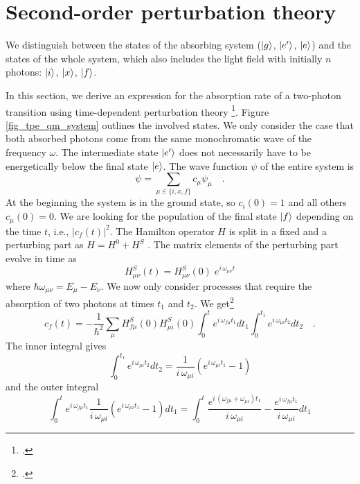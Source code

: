\section{Second-order perturbation theory}

\begin{marginfigure}

\caption{
We distinguish between the states of the absorbing system
($\ket{g}$, $\ket{e'}$, $\ket{e}$) and the states of the whole system, which
also includes the light field with initially $n$ photons: $\ket{i}$, $\ket{x}$, $\ket{f}$. }
\label{fig_tpe_qm_system}
\end{marginfigure}

In this section, we derive an expression for
the absorption rate of a two-photon transition using 
time-dependent perturbation theory
\footcite{Haken_wolf_II,mystre_quantum_optics}.
Figure \ref{fig_tpe_qm_system} outlines the involved
states. We only  consider the case
that both absorbed photons come from the same monochromatic
wave of the frequency $\omega$. The intermediate state 
$\ket{e'}$
does not necessarily have to be energetically below the final state $\ket{e}$.
The wave function $\psi$ of the entire system is
\begin{equation}
\psi = \sum_{\mu \in \{i, x, f\}} c_{\mu} \psi_{\mu} \quad.
\end{equation}
At the beginning the system is in the ground state, so $c_i(0)
= 1$ and all others $c_{\mu}(0) = 0$. We are looking for the population
of the final state $\ket{f}$ depending on the time $t$, i.e.,
$|c_f(t)|^2$. The Hamilton operator $H$ is split in a fixed and a perturbing part as
 $H = H^0 + H^S$ . 
The matrix elements of the perturbing part evolve in time as
\begin{equation}
H^S_{\mu \nu} (t) = H^S_{\mu \nu} (0) \; e^{i \, \omega_{\mu \nu}
t}
\end{equation}
where $\hbar \omega_{\mu \nu} = E_{\mu} - E_{\nu}$.
We now only consider processes that require the absorption of two photons at times $t_1$ and $t_2$. We get\footcite{Haken_wolf_II}
\begin{equation}
c_f(t) = - \frac{1}{\hbar^2} \sum_{\mu} H^S_{f \mu} (0) H^S_{\mu
i} (0)\int_0^t e^{i \,\omega_{f \mu} t_1} dt_1 \int_0^{t_1} e^{i
\,\omega_{\mu i} t_2} dt_2 \quad .
\end{equation}
The inner integral gives
\begin{equation}
\int_0^{t_1} e^{i \,\omega_{\mu i} t_2} dt_2 =
\frac{1}{i \,\omega_{\mu i}} \left( e^{i \,\omega_{\mu i} t_1} -1
\right)
\end{equation}
and the outer integral
\begin{equation}
\int_0^t e^{i \,\omega_{f \mu} t_1} \frac{1}{i \,\omega_{\mu i}}
\left( e^{i \,\omega_{\mu i} t_1} -1 \right) dt_1 = %
\int_0^t  \frac{e^{i \,(\omega_{f \mu}+\omega_{ \mu i}) t_1}}{i
\,\omega_{\mu i}} %
-   \frac{e^{i \,\omega_{ f \mu } t_1}}{i \,\omega_{\mu i}} dt_1
\end{equation}

